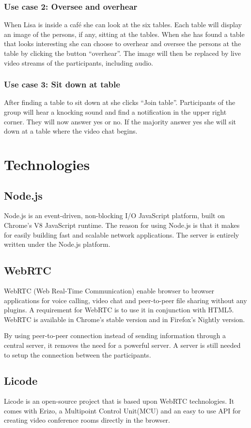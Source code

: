 \documentclass[12pt, titlepage]{article}
\begin{document}
\subsubsection{Use case 2: Oversee and overhear}
When Lisa is inside a café she can look at the six tables. Each table will display an image of the persons, if any, sitting at the tables. When she has found a table that looks interesting she can choose to overhear and oversee the persons at the table by clicking the button “overhear”. The image will then be replaced by live video streams of the participants, including audio.
\subsubsection{Use case 3: Sit down at table}
After finding a table to sit down at she clicks “Join table”. Participants of the group will hear a knocking sound and find a notification in the upper right corner. They will now answer yes or no. If the majority answer yes she will sit down at a table where the video chat begins.
\section{Technologies}
\subsection{Node.js}
Node.js\cite{26} is an event-driven, non-blocking I/O JavaScript platform, built on Chrome's V8 JavaScript runtime. The reason for using Node.js is that it makes for easily building fast and scalable network applications. The server is entirely written under the Node.js platform.
\subsection{WebRTC}
WebRTC\cite{27} (Web Real-Time Communication) enable browser to browser applications for voice calling, video chat and peer-to-peer file sharing without any plugins. A requirement for WebRTC is to use it in conjunction with HTML5. WebRTC is available in Chrome's stable version and in Firefox's Nightly version.

By using peer-to-peer connection instead of sending information through a central server, it removes the need for a powerful server. A server is still needed to setup the connection between the participants.
\subsection{Licode}
Licode\cite{28} is an open-source project that is based upon WebRTC technologies. It comes with Erizo, a Multipoint Control Unit(MCU) and an easy to use API for creating video conference rooms directly in the browser. 
\end{document}
